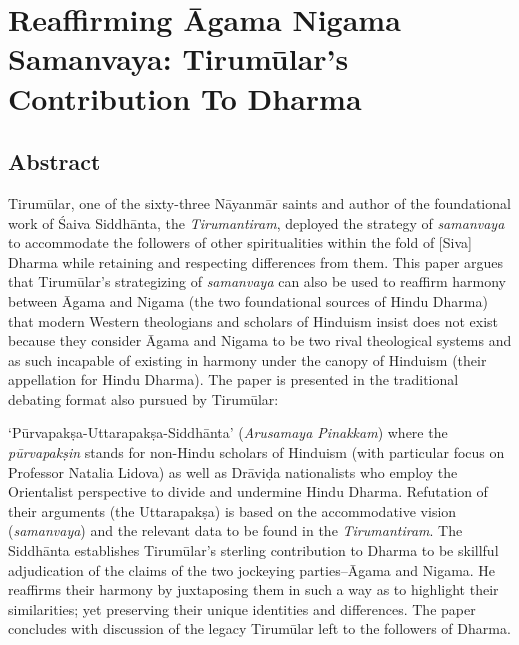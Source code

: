 
\chapter{Reaffirming Āgama Nigama Samanvaya: Tirumūlar’s Contribution To Dharma}\label{chapter10}



\section*{Abstract}

Tirumūlar, one of the sixty-three Nāyanmār saints and author of the foundational work of Śaiva Siddhānta, the \textit{Tirumantiram}, deployed the strategy of \textit{samanvaya} to accommodate the followers of other spiritualities within the fold of [Siva] Dharma while retaining and respecting differences from them. This paper argues that Tirumūlar’s strategizing of \textit{samanvaya} can also be used to reaffirm harmony between Āgama and Nigama (the two foundational sources of Hindu Dharma) that modern Western theologians and scholars of Hinduism insist does not exist because they consider Āgama and Nigama to be two rival theological systems and as such incapable of existing in harmony under the canopy of Hinduism (their appellation for Hindu Dharma). The paper is presented in the traditional debating format also pursued by Tirumūlar:

‘Pūrvapakṣa-Uttarapakṣa-Siddhānta’ (\textit{Arusamaya Pinakkam}) where the \textit{pūrvapakṣin} stands for non-Hindu scholars of Hinduism (with particular focus on Professor Natalia Lidova) as well as Drāviḍa nationalists who employ the Orientalist perspective to divide and undermine Hindu Dharma. Refutation of their arguments (the Uttarapakṣa) is based on the accommodative vision (\textit{samanvaya}) and the relevant data to be found in the \textit{Tirumantiram}. The Siddhānta establishes Tirumūlar’s sterling contribution to Dharma to be skillful adjudication of the claims of the two jockeying parties--Āgama and Nigama. He reaffirms their harmony by juxtaposing them in such a way as to highlight their similarities; yet preserving their unique identities and differences. The paper concludes with discussion of the legacy Tirumūlar left to the followers of Dharma.


